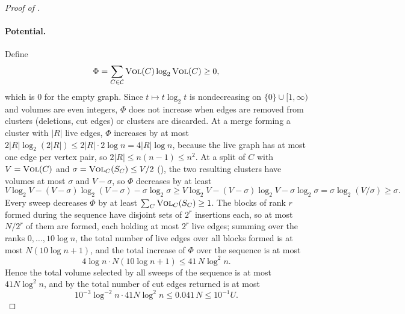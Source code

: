 \documentclass[11pt]{article}
\theoremstyle{remark}
\newcommand{\Ccal}{\mathcal{C}}
\newcommand{\vol}{\textsc{Vol}}
\begin{document}
\begin{proof}[Proof of ]
\paragraph{Potential.}
Define
\[
\Phi = \sum_{C \in \Ccal} \vol(C) \log_2 \vol(C) \ge 0 ,
\]
which is $0$ for the empty graph.
Since $t \mapsto t \log_2 t$ is nondecreasing on $\{0\} \cup [1, \infty)$
and volumes are even integers, $\Phi$ does not increase when edges are
removed from clusters (deletions, cut edges) or clusters are discarded.
At a merge forming a cluster with $|R|$ live edges, $\Phi$ increases by at
most $2|R| \log_2 (2|R|) \le 2|R| \cdot 2 \log n = 4|R| \log n$, because the
live graph has at most one edge per vertex pair, so $2|R| \le n(n-1) \le n^{2}$.
At a split of $C$ with $V = \vol(C)$ and $\sigma = \vol_C(S_C) \le V/2$
(), the two resulting clusters have volumes at most
$\sigma$ and $V - \sigma$, so $\Phi$ decreases by at least
\[
V \log_2 V - (V - \sigma) \log_2 (V - \sigma) - \sigma \log_2 \sigma
\ge V \log_2 V - (V - \sigma) \log_2 V - \sigma \log_2 \sigma
= \sigma \log_2 (V/\sigma)
\ge \sigma .
\]
Every sweep decreases $\Phi$ by at least $\sum_C \vol_C(S_C) \ge 1$.
The blocks of rank $r$ formed during the sequence have disjoint sets of
$2^{r}$ insertions each, so at most $N / 2^{r}$ of them are formed, each
holding at most $2^{r}$ live edges; summing over the ranks $0, \dots,
10 \log n$, the total number of live edges over all blocks formed is at
most $N (10 \log n + 1)$, and the total increase of $\Phi$ over the
sequence is at most
\[
4 \log n \cdot N (10 \log n + 1) \le 41 \, N \log^{2} n .
\]
Hence the total volume selected by all sweeps of the sequence is at most
$41 N \log^{2} n$, and by  the total number of cut edges
returned is at most
\[
10^{-3} \log^{-2} n \cdot 41 N \log^{2} n \le 0.041 \, N \le 10^{-1} U .
\]


\end{proof}
\end{document}
